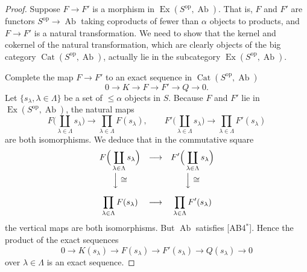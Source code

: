 \documentclass[11pt,a4paper]{article}
\theoremstyle{plain}
\theoremstyle{definition}
\DeclareMathOperator{\Cat}{Cat}
\DeclareMathOperator{\Ex}{Ex}
\DeclareMathOperator{\Ab}{Ab}
\newcommand{\op}{\mathrm{op}}
\numberwithin{equation}{section}
\begin{document}
\begin{proof}
Suppose $F \to F'$ is a morphism in $\Ex(S^{\op},\Ab)$. That is, $F$ and $F'$ are functors $S^{\op} \to \Ab$ taking coproducts of fewer than $\alpha$ objects to products, and $F \to F'$ is a natural transformation. We need to show that the kernel and cokernel of the natural transformation, which are clearly objects of the big category $\Cat(S^{\op},\Ab)$, actually lie in the subcategory $\Ex(S^{\op},\Ab)$.

Complete the map $F \to F'$ to an exact sequence in $\Cat(S^{\op},\Ab)$
\begin{equation*}
0 \longrightarrow K \longrightarrow F \longrightarrow F' \longrightarrow Q \longrightarrow 0.
\end{equation*}
Let $\{s_{\lambda}, \lambda \in \Lambda\}$ be a set of $\leq\alpha$ objects in $S$. Because $F$ and $F'$ lie in $\Ex(S^{\op},\Ab)$, the natural maps
\begin{equation*}
F\Big(\coprod_{\lambda\in\Lambda} s_{\lambda}\Big) \longrightarrow \prod_{\lambda\in\Lambda} F(s_{\lambda}), \qquad
F'\Big(\coprod_{\lambda\in\Lambda} s_{\lambda}\Big) \longrightarrow \prod_{\lambda\in\Lambda} F'(s_{\lambda})
\end{equation*}
are both isomorphisms. We deduce that in the commutative square
\begin{equation*}
\begin{array}{ccc}
\displaystyle F\Big(\coprod_{\lambda\in\Lambda} s_{\lambda}\Big) & \longrightarrow & \displaystyle F'\Big(\coprod_{\lambda\in\Lambda} s_{\lambda}\Big) \\[12pt]
\Big\downarrow\cong & & \Big\downarrow\cong \\[12pt]
\displaystyle \prod_{\lambda\in\Lambda} F(s_{\lambda}) & \longrightarrow & \displaystyle \prod_{\lambda\in\Lambda} F'(s_{\lambda})
\end{array}
\end{equation*}
the vertical maps are both isomorphisms. But $\Ab$ satisfies [AB4$^{*}$]. Hence the product of the exact sequences
\begin{equation*}
0 \longrightarrow K(s_{\lambda}) \longrightarrow F(s_{\lambda}) \longrightarrow F'(s_{\lambda}) \longrightarrow Q(s_{\lambda}) \longrightarrow 0
\end{equation*}
over $\lambda \in \Lambda$ is an exact sequence.


\end{proof}
\end{document}
